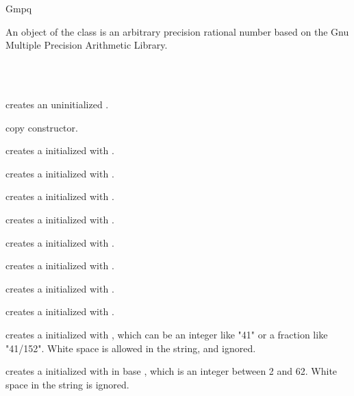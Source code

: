 \begin{ccRefClass} {Gmpq}
\label{Gmpq}

\ccDefinition

An object of the class  is an arbitrary precision rational
number based on the {\sc Gnu} Multiple Precision Arithmetic Library. 


\ccIsModel
{}\\
\\

\ccCreation
{}

             {creates an uninitialized  \ccVar.}

\ccHidden {}
            {copy constructor.}\ccGlue


            {creates a  initialized with
             .}\ccGlue


            {creates a  initialized with
             .}\ccGlue


            {creates a  initialized with
             .}\ccGlue


            {creates a  initialized with
             .}\ccGlue


            {creates a  initialized with
             .}\ccGlue


            {creates a  initialized with
             .}\ccGlue


            {creates a  initialized with
             .}\ccGlue


            {creates a  initialized with
             .}


            {creates a  initialized with , which can
	    be an integer like "41" or a fraction like "41/152". White
	    space is allowed in the string, and ignored.}\ccGlue


            {creates a  initialized with  in base
	    , which is an integer between 2 and 62. White space
	    in the string is ignored.}


\end{ccRefClass}
